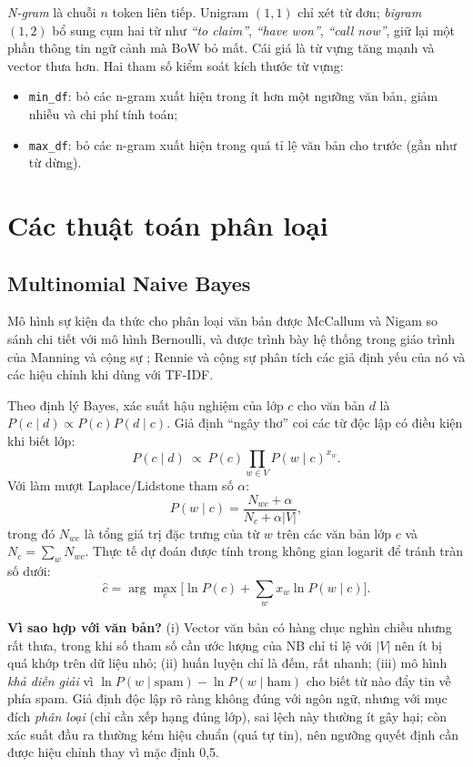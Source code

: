 \textit{N-gram} là chuỗi $n$ token liên tiếp. Unigram $(1,1)$ chỉ xét từ đơn; \textit{bigram} $(1,2)$ bổ sung cụm hai từ như \textit{``to claim''}, \textit{``have won''}, \textit{``call now''}, giữ lại một phần thông tin ngữ cảnh mà BoW bỏ mất. Cái giá là từ vựng tăng mạnh và vector thưa hơn. Hai tham số kiểm soát kích thước từ vựng:
\begin{itemize}
    \item \texttt{min\_df}: bỏ các n-gram xuất hiện trong ít hơn một ngưỡng văn bản, giảm nhiễu và chi phí tính toán;
    \item \texttt{max\_df}: bỏ các n-gram xuất hiện trong quá tỉ lệ văn bản cho trước (gần như từ dừng).
\end{itemize}

\section{Các thuật toán phân loại}

\subsection{Multinomial Naive Bayes}

Mô hình sự kiện đa thức cho phân loại văn bản được McCallum và Nigam \cite{mccallum1998} so sánh chi tiết với mô hình Bernoulli, và được trình bày hệ thống trong giáo trình của Manning và cộng sự \cite{manning2008}; Rennie và cộng sự \cite{rennie2003} phân tích các giả định yếu của nó và các hiệu chỉnh khi dùng với TF-IDF.

Theo định lý Bayes, xác suất hậu nghiệm của lớp $c$ cho văn bản $d$ là $P(c\mid d)\propto P(c)P(d\mid c)$. Giả định ``ngây thơ'' coi các từ độc lập có điều kiện khi biết lớp:
\begin{equation}
P(c\mid d)\ \propto\ P(c)\prod_{w\in V}P(w\mid c)^{x_w}.
\end{equation}
Với làm mượt Laplace/Lidstone tham số $\alpha$:
\begin{equation}
P(w\mid c)=\frac{N_{wc}+\alpha}{N_c+\alpha|V|},
\end{equation}
trong đó $N_{wc}$ là tổng giá trị đặc trưng của từ $w$ trên các văn bản lớp $c$ và $N_c=\sum_{w}N_{wc}$. Thực tế dự đoán được tính trong không gian logarit để tránh tràn số dưới:
\begin{equation}
\hat{c}=\arg\max_c\Big[\ln P(c)+\sum_{w}x_w\ln P(w\mid c)\Big].
\end{equation}

\textbf{Vì sao hợp với văn bản?} (i) Vector văn bản có hàng chục nghìn chiều nhưng rất thưa, trong khi số tham số cần ước lượng của NB chỉ tỉ lệ với $|V|$ nên ít bị quá khớp trên dữ liệu nhỏ; (ii) huấn luyện chỉ là đếm, rất nhanh; (iii) mô hình \textit{khả diễn giải} vì $\ln P(w\mid\mathrm{spam})-\ln P(w\mid\mathrm{ham})$ cho biết từ nào đẩy tin về phía spam. Giả định độc lập rõ ràng không đúng với ngôn ngữ, nhưng với mục đích \textit{phân loại} (chỉ cần xếp hạng đúng lớp), sai lệch này thường ít gây hại; còn xác suất đầu ra thường kém hiệu chuẩn (quá tự tin), nên ngưỡng quyết định cần được hiệu chỉnh thay vì mặc định 0,5.

